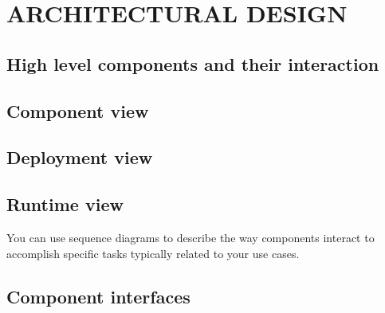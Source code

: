 \documentclass{article}
\begin{document}
	\section{ARCHITECTURAL DESIGN}
	
	\subsection{High level components and their interaction}
	\subsection{Component view}
	\subsection{Deployment view}
	\subsection{Runtime view}
	You can use sequence diagrams to describe the way components interact to accomplish specific tasks typically related to your use cases.
	\subsection{Component interfaces}
\end{document}
